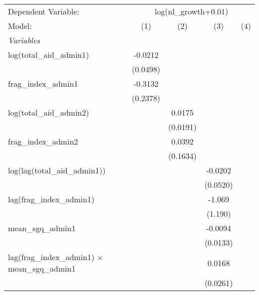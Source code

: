 \begingroup
\centering
\begin{tabular}{lcccc}
   \tabularnewline \midrule \midrule
   Dependent Variable: & \multicolumn{4}{c}{log(nl\_growth+0.01)}\\
   Model:                                                   & (1)      & (2)      & (3)      & (4)\\  
   \midrule
   \emph{Variables}\\
   log(total\_aid\_admin1)                                  & -0.0212  &          &          &   \\   
                                                            & (0.0498) &          &          &   \\   
   frag\_index\_admin1                                      & -0.3132  &          &          &   \\   
                                                            & (0.2378) &          &          &   \\   
   log(total\_aid\_admin2)                                  &          & 0.0175   &          &   \\   
                                                            &          & (0.0191) &          &   \\   
   frag\_index\_admin2                                      &          & 0.0392   &          &   \\   
                                                            &          & (0.1634) &          &   \\   
   log(lag(total\_aid\_admin1))                             &          &          & -0.0202  &   \\   
                                                            &          &          & (0.0520) &   \\   
   lag(frag\_index\_admin1)                                 &          &          & -1.069   &   \\   
                                                            &          &          & (1.190)  &   \\   
   mean\_sgq\_admin1                                        &          &          & -0.0094  &   \\   
                                                            &          &          & (0.0133) &   \\   
   lag(frag\_index\_admin1) $\times$ mean\_sgq\_admin1      &          &          & 0.0168   &   \\   
                                                            &          &          & (0.0261) &   \\   

\end{tabular}

